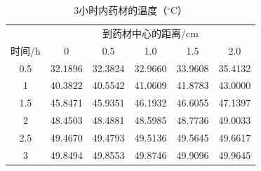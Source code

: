 \begin{table}[htbp]\centering\small
\caption{3小时内药材的温度（$^\circ$C）}\label{tab_q2T}
\renewcommand{\arraystretch}{1.12}
\begin{tabular}{cccccc}\toprule
 & \multicolumn{5}{c}{到药材中心的距离/cm}\\
时间/h & 0 & 0.5 & 1.0 & 1.5 & 2.0\\\midrule
0.5 & 32.1896 & 32.3824 & 32.9660 & 33.9608 & 35.4132\\
1 & 40.3822 & 40.5542 & 41.0609 & 41.8783 & 43.0000\\
1.5 & 45.8471 & 45.9351 & 46.1932 & 46.6055 & 47.1397\\
2 & 48.4503 & 48.4881 & 48.5985 & 48.7736 & 49.0033\\
2.5 & 49.4670 & 49.4793 & 49.5136 & 49.5645 & 49.6617\\
3 & 49.8494 & 49.8553 & 49.8746 & 49.9096 & 49.9645\\
\bottomrule\end{tabular}
\end{table}
